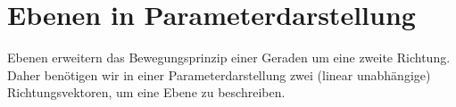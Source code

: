 \section{Ebenen in Parameterdarstellung}
\label{sec:analytic_geometry_planes}

Ebenen erweitern das Bewegungsprinzip einer Geraden um eine zweite Richtung.
Daher benötigen wir in einer Parameterdarstellung zwei (linear unabhängige)
Richtungsvektoren, um eine Ebene zu beschreiben.



